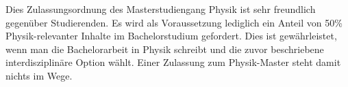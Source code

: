 Dies Zulassungsordnung des Masterstudiengang Physik ist sehr freundlich gegenüber Studierenden. Es wird als Voraussetzung lediglich ein Anteil von 50\% Physik-relevanter Inhalte im Bachelorstudium gefordert. Dies ist gewährleistet, wenn man die Bachelorarbeit in Physik schreibt und die zuvor beschriebene interdisziplinäre Option wählt. Einer Zulassung zum Physik-Master steht damit nichts im Wege.



%
%
%
%
%
